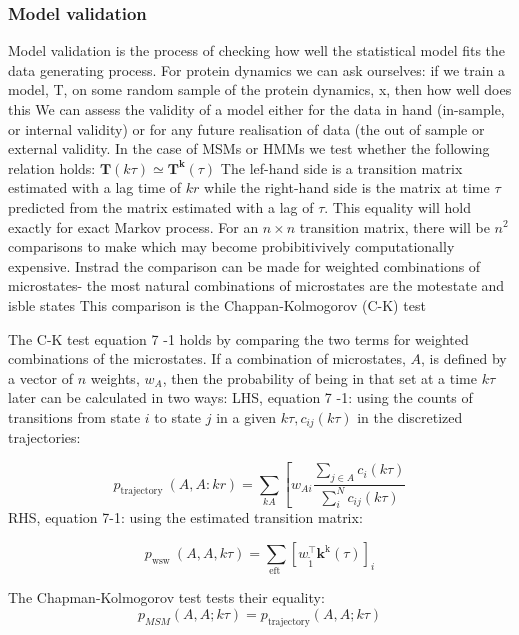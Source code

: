 \subsubsection{Model validation}

Model validation is the process of checking how well the statistical model fits the data generating process. For protein dynamics we can ask ourselves: if we train a model, T, on some random sample of the protein dynamics, x, then how well does this We can assess the validity of a model either for the data in hand (in-sample, or internal validity) or for any future realisation of data (the out of sample or external validity. In the case of MSMs or HMMs we test whether the following relation holds:
$\mathbf{T}(k \tau) \simeq \mathbf{T}^{\mathbf{k}}(\tau)$
The lef-hand side is a transition matrix estimated with a lag time of $k r$ while the right-hand side is the matrix at time $\tau$ predicted from the matrix estimated with a lag of $\tau$. This equality will hold exactly for exact Markov process. For an $n \times n$ transition matrix, there will be $n^{2}$ comparisons to make which may become probibitivively computationally expensive. Instrad the comparison can be made for weighted combinations of microstates- the most natural combinations of microstates are the motestate and isble states This comparison is the Chappan-Kolmogorov (C-K) test

The C-K test equation 7 -1 holds by comparing the two terms for weighted combinations of the microstates. If a combination of microstates, $A$, is defined by a vector of $n$ weights, $w_{A}$, then the probability of being in that set at a time $k \tau$ later can be calculated in two ways:
LHS, equation 7 -1: using the counts of transitions from state $i$ to state $j$ in a given $k \tau, c_{i j}(k \tau)$ in the discretized trajectories:

\begin{equation}
p_{\text {trajectory }}(A, A: k r)=\sum_{k A}\left[w_{A i} \frac{\sum_{j \in A} c_{i}(k \tau)}{\sum_{i}^{N} c_{i j}(k \tau)}\right.
\end{equation}
RHS, equation 7-1: using the estimated transition matrix:

\begin{equation}
p_{\text {wsw }}(A, A, k \tau)=\sum_{\text {eft }}\left[w_{\tilde{1}}^{\top} \mathbf{k}^{\mathrm{k}}(\tau)\right]_{i}
\end{equation}

The Chapman-Kolmogorov test tests their equality:
\begin{equation}
p_{M S M}(A, A ; k \tau)=p_{\text {trajectory}}(A, A ; k \tau)
\end{equation}

